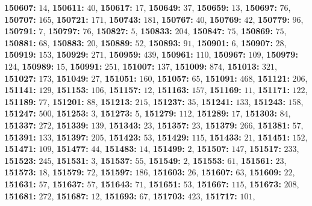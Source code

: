\textsf{\bfseries 150607:} $14$, \textsf{\bfseries 150611:} $40$, \textsf{\bfseries 150617:} $17$, \textsf{\bfseries 150649:} $37$, \textsf{\bfseries 150659:} $13$, \textsf{\bfseries 150697:} $76$, \textsf{\bfseries 150707:} $165$, \textsf{\bfseries 150721:} $171$, \textsf{\bfseries 150743:} $181$, \textsf{\bfseries 150767:} $40$, \textsf{\bfseries 150769:} $42$, \textsf{\bfseries 150779:} $96$, \textsf{\bfseries 150791:} $7$, \textsf{\bfseries 150797:} $76$, \textsf{\bfseries 150827:} $5$, \textsf{\bfseries 150833:} $204$, \textsf{\bfseries 150847:} $75$, \textsf{\bfseries 150869:} $75$, \textsf{\bfseries 150881:} $68$, \textsf{\bfseries 150883:} $20$, \textsf{\bfseries 150889:} $52$, \textsf{\bfseries 150893:} $91$, \textsf{\bfseries 150901:} $6$, \textsf{\bfseries 150907:} $28$, \textsf{\bfseries 150919:} $153$, \textsf{\bfseries 150929:} $271$, \textsf{\bfseries 150959:} $439$, \textsf{\bfseries 150961:} $110$, \textsf{\bfseries 150967:} $109$, \textsf{\bfseries 150979:} $124$, \textsf{\bfseries 150989:} $15$, \textsf{\bfseries 150991:} $251$, \textsf{\bfseries 151007:} $137$, \textsf{\bfseries 151009:} $874$, \textsf{\bfseries 151013:} $321$, \textsf{\bfseries 151027:} $173$, \textsf{\bfseries 151049:} $27$, \textsf{\bfseries 151051:} $160$, \textsf{\bfseries 151057:} $65$, \textsf{\bfseries 151091:} $468$, \textsf{\bfseries 151121:} $206$, \textsf{\bfseries 151141:} $129$, \textsf{\bfseries 151153:} $106$, \textsf{\bfseries 151157:} $12$, \textsf{\bfseries 151163:} $157$, \textsf{\bfseries 151169:} $11$, \textsf{\bfseries 151171:} $122$, \textsf{\bfseries 151189:} $77$, \textsf{\bfseries 151201:} $88$, \textsf{\bfseries 151213:} $215$, \textsf{\bfseries 151237:} $35$, \textsf{\bfseries 151241:} $133$, \textsf{\bfseries 151243:} $158$, \textsf{\bfseries 151247:} $500$, \textsf{\bfseries 151253:} $3$, \textsf{\bfseries 151273:} $5$, \textsf{\bfseries 151279:} $112$, \textsf{\bfseries 151289:} $17$, \textsf{\bfseries 151303:} $84$, \textsf{\bfseries 151337:} $272$, \textsf{\bfseries 151339:} $139$, \textsf{\bfseries 151343:} $23$, \textsf{\bfseries 151357:} $23$, \textsf{\bfseries 151379:} $266$, \textsf{\bfseries 151381:} $57$, \textsf{\bfseries 151391:} $133$, \textsf{\bfseries 151397:} $205$, \textsf{\bfseries 151423:} $53$, \textsf{\bfseries 151429:} $115$, \textsf{\bfseries 151433:} $21$, \textsf{\bfseries 151451:} $152$, \textsf{\bfseries 151471:} $109$, \textsf{\bfseries 151477:} $44$, \textsf{\bfseries 151483:} $14$, \textsf{\bfseries 151499:} $2$, \textsf{\bfseries 151507:} $147$, \textsf{\bfseries 151517:} $233$, \textsf{\bfseries 151523:} $245$, \textsf{\bfseries 151531:} $3$, \textsf{\bfseries 151537:} $55$, \textsf{\bfseries 151549:} $2$, \textsf{\bfseries 151553:} $61$, \textsf{\bfseries 151561:} $23$, \textsf{\bfseries 151573:} $18$, \textsf{\bfseries 151579:} $72$, \textsf{\bfseries 151597:} $186$, \textsf{\bfseries 151603:} $26$, \textsf{\bfseries 151607:} $63$, \textsf{\bfseries 151609:} $22$, \textsf{\bfseries 151631:} $57$, \textsf{\bfseries 151637:} $57$, \textsf{\bfseries 151643:} $71$, \textsf{\bfseries 151651:} $53$, \textsf{\bfseries 151667:} $115$, \textsf{\bfseries 151673:} $208$, \textsf{\bfseries 151681:} $272$, \textsf{\bfseries 151687:} $12$, \textsf{\bfseries 151693:} $67$, \textsf{\bfseries 151703:} $423$, \textsf{\bfseries 151717:} $101$, 
